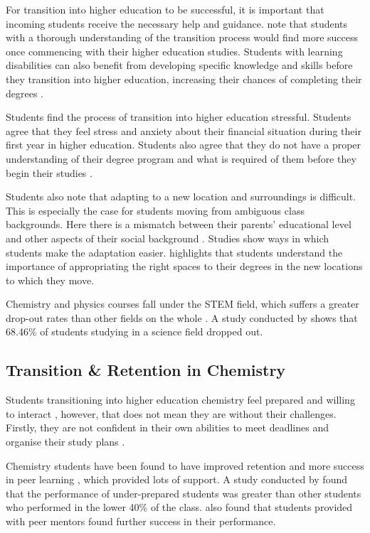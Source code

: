 \documentclass{l4proj}
\begin{document}
For transition into higher education to be successful,  it is important that incoming students receive the necessary help and guidance. \citet{briggs2012building} note that students with a thorough understanding of the transition process would find more success once commencing with their higher education studies. Students with learning disabilities can also benefit from developing specific knowledge and skills before they transition into higher education,  increasing their chances of completing their degrees \citep{milsom2005assisting}.

Students find the process of transition into higher education stressful. Students agree that they feel stress and anxiety about their financial situation during their first year in higher education. Students also agree that they do not have a proper understanding of their degree program and what is required of them before they begin their studies \citep{briggs2012building}. 

Students also note that adapting to a new location and surroundings is difficult. This is especially the case for students moving from ambiguous class backgrounds. Here there is a mismatch between their parents’ educational level and other aspects of their social background \citep{ivemark2021habitus}. Studies show ways in which students make the adaptation easier. \citet{holton2015adapting} highlights that students understand the importance of appropriating the right spaces to their degrees in the new locations to which they move.

Chemistry and physics courses fall under the STEM field,  which suffers a greater drop-out rates than other fields on the whole \citep{freeman2001recruiting}. A study conducted by \citet{echchafi2021analytical} shows that 68.46\% of students studying in a science field dropped out.

\subsection{Transition \& Retention in Chemistry}
Students transitioning into higher education chemistry feel prepared and willing to interact \citep{lovatt2013investigating},  however, that does not mean they are without their challenges. Firstly, they are not confident in their own abilities to meet deadlines and organise their study plans \citep{lovatt2013investigating}.

Chemistry students have been found to have improved retention and more success in peer learning \citep{kingsepp2020analyzing},  which provided lots of support. A study conducted by \citet{shields2012transition} found that the performance of under-prepared students was greater than other students who performed in the lower 40\% of the class. \citet{shields2012transition} also found that students provided with peer mentors found further success in their performance.
\end{document}
